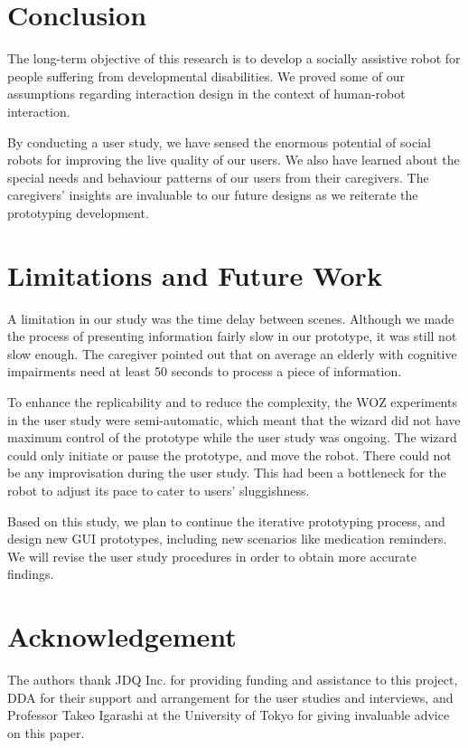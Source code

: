 \documentclass[letterpaper, 10 pt, conference]{ieeeconf}  %
\begin{document}
\section{Conclusion}

The long-term objective of this research is to develop a socially assistive robot for people suffering from developmental disabilities. We proved some of our assumptions regarding interaction design in the context of human-robot interaction. 

By conducting a user study, we have sensed the enormous potential of social robots for improving the live quality of our users. We also have learned about the special needs and behaviour patterns of our users from their caregivers. The caregivers' insights are invaluable to our future designs as we reiterate the prototyping development.

\section{Limitations and Future Work}

A limitation in our study was the time delay between scenes. Although we made the process of presenting information fairly slow in our prototype, it was still not slow enough. The caregiver pointed out that on average an elderly with cognitive impairments need at least 50 seconds to process a piece of information. 

To enhance the replicability and to reduce the complexity, the WOZ experiments in the user study were semi-automatic, which meant that the wizard did not have maximum control of the prototype while the user study was ongoing. The wizard could only initiate or pause the prototype, and move the robot. There could not be any improvisation during the user study. This had been a bottleneck for the robot to adjust its pace to cater to users' sluggishness.

Based on this study, we plan to continue the iterative prototyping process, and design new GUI prototypes, including new scenarios like medication reminders. We will revise the user study procedures in order to obtain more accurate findings.

\section{Acknowledgement}
The authors thank JDQ Inc. for providing funding and assistance to this project, DDA for their support and arrangement for the user studies and interviews, and Professor Takeo Igarashi at the University of Tokyo for giving invaluable advice on this paper.
\end{document}

